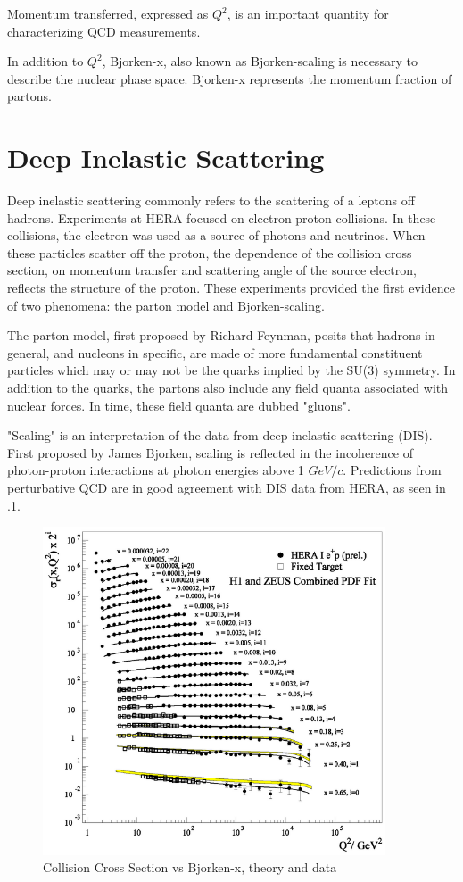 Momentum transferred, expressed as $Q^2$, is an important quantity for characterizing QCD measurements. 

In addition to $Q^2$, Bjorken-x, also known as Bjorken-scaling is necessary to describe the nuclear phase space. Bjorken-x represents the momentum fraction of partons. 

\section{Deep Inelastic Scattering}

Deep inelastic scattering commonly refers to the scattering of a leptons off hadrons. Experiments at HERA focused on electron-proton collisions. In these collisions, the electron was used as a source of photons and neutrinos. When these particles scatter off the proton, the dependence of the collision cross section, on momentum transfer and scattering angle of the source electron, reflects the structure of the proton. These experiments provided the first evidence of two phenomena: the parton model and Bjorken-scaling. 

The parton model, first proposed by Richard Feynman, posits that hadrons in general, and nucleons in specific, are made of more fundamental constituent particles which may or may not be the quarks implied by the SU(3) symmetry. In addition to the quarks, the partons also include any field quanta associated with nuclear forces. In time, these field quanta are dubbed "gluons".

"Scaling" is an interpretation of the data from deep inelastic scattering (DIS). First proposed by James Bjorken, scaling is reflected in the incoherence of photon-proton interactions at photon energies above 1 $GeV/c$. Predictions from perturbative QCD are in good agreement with DIS data from HERA, as seen in .\ref{fig:qcdBjorkenX}.

\begin{figure}[h!]
\begin{centering}
\includegraphics[width=4in]{Chapter1/importfigs/scholarpedia_bjorken_x_qcdExp.png}
\par\end{centering}
\caption{Collision Cross Section vs Bjorken-x, theory and data \label{fig:qcdBjorkenX}}
\end{figure}

